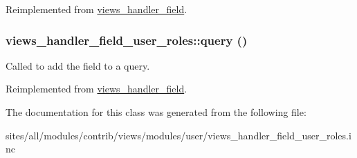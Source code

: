 Reimplemented from \hyperlink{classviews__handler__field_e30a1d9c98c62ae40c90b938e09cd0ec}{views\_\-handler\_\-field}.\hypertarget{classviews__handler__field__user__roles_26513786d88b63b1e2dcfd4aa09c4552}{
\subsubsection[{query}]{\setlength{\rightskip}{0pt plus 5cm}views\_\-handler\_\-field\_\-user\_\-roles::query ()}}
\label{classviews__handler__field__user__roles_26513786d88b63b1e2dcfd4aa09c4552}


Called to add the field to a query. 

Reimplemented from \hyperlink{classviews__handler__field_4f661f91bcbe80d4a00c30a31456c502}{views\_\-handler\_\-field}.

The documentation for this class was generated from the following file:\begin{CompactItemize}
\item 
sites/all/modules/contrib/views/modules/user/views\_\-handler\_\-field\_\-user\_\-roles.inc\end{CompactItemize}
